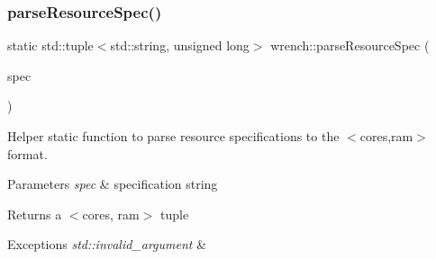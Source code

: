 \subsubsection{\texorpdfstring{parse\+Resource\+Spec()}{parseResourceSpec()}}
{\footnotesize\ttfamily static std\+::tuple$<$std\+::string, unsigned long$>$ wrench\+::parse\+Resource\+Spec (\begin{DoxyParamCaption}\item[{std\+::string}]{spec }\end{DoxyParamCaption})\hspace{0.3cm}{\ttfamily [static]}}



Helper static function to parse resource specifications to the $<$cores,ram$>$ format. 


\begin{DoxyParams}{Parameters}
{\em spec} & specification string \\
\hline
\end{DoxyParams}
\begin{DoxyReturn}{Returns}
a $<$cores, ram$>$ tuple 
\end{DoxyReturn}

\begin{DoxyExceptions}{Exceptions}
{\em std\+::invalid\+\_\+argument} & \\
\hline
\end{DoxyExceptions}
